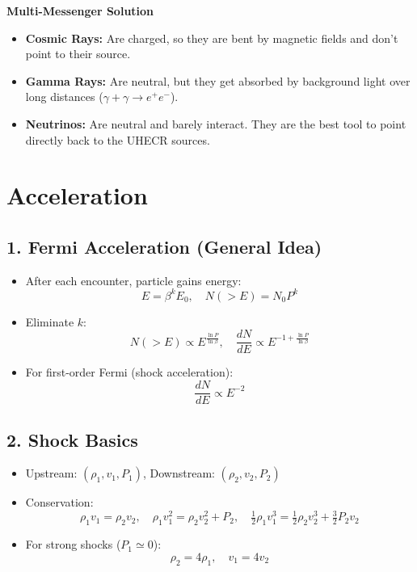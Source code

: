 \documentclass{sciposter}
\begin{document}
\begin{multicols}{3}
\textbf{Multi-Messenger Solution}
    \begin{itemize}
        \item \textbf{Cosmic Rays:} Are charged, so they are bent by magnetic fields and don't point to their source.
        \item \textbf{Gamma Rays:} Are neutral, but they get absorbed by background light over long distances ($\gamma + \gamma \rightarrow e^+e^-$).
        \item \textbf{Neutrinos:} Are neutral and barely interact. They are the best tool to point directly back to the UHECR sources.
    \end{itemize}




\section{Acceleration}

\subsection*{1. Fermi Acceleration (General Idea)}
\begin{itemize}
    \item After each encounter, particle gains energy:
    \[
        E = \beta^k E_0, \quad N(>E) = N_0 P^k
    \]
    \item Eliminate $k$:
    \[
        N(>E) \propto E^{\frac{\ln P}{\ln \beta}}, \quad 
        \frac{dN}{dE} \propto E^{-1 + \frac{\ln P}{\ln \beta}}
    \]
    \item For first-order Fermi (shock acceleration): 
    \[
        \frac{dN}{dE} \propto E^{-2}
    \]
\end{itemize}

\subsection*{2. Shock Basics}
\begin{itemize}
    \item Upstream: $(\rho_1, v_1, P_1)$, Downstream: $(\rho_2, v_2, P_2)$
    \item Conservation:
    \[
        \rho_1 v_1 = \rho_2 v_2, \quad
        \rho_1 v_1^2 = \rho_2 v_2^2 + P_2, \quad
        \tfrac{1}{2}\rho_1 v_1^3 = \tfrac{1}{2}\rho_2 v_2^3 + \tfrac{3}{2}P_2 v_2
    \]
    \item For strong shocks ($P_1 \simeq 0$):
    \[
        \rho_2 = 4\rho_1, \quad v_1 = 4v_2
    \]
\end{itemize}


\end{multicols}
\end{document}
